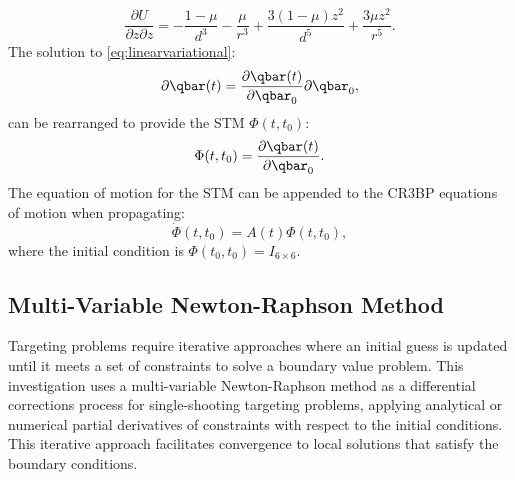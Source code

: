 \vspace{1mm}
\begin{equation}
    \frac{\partial U}{\partial z\partial z}=-\frac{1-\mu}{d^{3}}-\frac{\mu}{r^{3}}+\frac{3(1-\mu)z^{2}}{d^{5}}+\frac{3\mu z^{2}}{r^{5}}.
    \label{eq:partialUpartialzz}
\end{equation}
The solution to \cref{eq:linearvariational}:
\begin{equation}
    \partial\qbar(t)=\frac{\partial\qbar(t)}{\partial\qbar_{0}}\partial\qbar_{0},
    \label{eq:variationalsolution}
\end{equation}
can be rearranged to provide the STM $\Phi(t,t_{0})$:
\begin{equation}
    \Phi(t,t_{0})=\frac{\partial\qbar(t)}{\partial\qbar_{{0}}}.
    \label{eq:STM}
\end{equation}
The equation of motion for the STM can be appended to the CR3BP equations of motion when
propagating:
\begin{equation}
    \dot{\Phi}(t,t_{0})=A(t)\Phi(t,t_{0}),
    \label{eq:STMEoM}
\end{equation}
where the initial condition is $\Phi(t_{0},t_{0})=I_{6\times6}$.

\subsection{Multi-Variable Newton-Raphson Method}
Targeting problems require iterative approaches where an initial guess is updated until it meets a
set of constraints to solve a boundary value problem. This investigation uses a multi-variable
Newton-Raphson method as a differential corrections process for single-shooting targeting problems,
applying analytical or numerical partial derivatives of constraints with respect to the initial
conditions. This iterative approach facilitates convergence to local solutions that satisfy the
boundary conditions.

